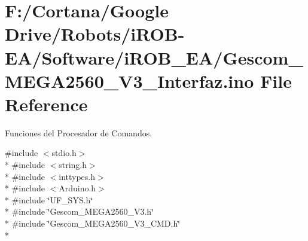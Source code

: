 \hypertarget{_gescom___m_e_g_a2560___v3___interfaz_8ino}{}\section{F\+:/\+Cortana/\+Google Drive/\+Robots/i\+R\+O\+B-\/\+E\+A/\+Software/i\+R\+O\+B\+\_\+\+E\+A/\+Gescom\+\_\+\+M\+E\+G\+A2560\+\_\+\+V3\+\_\+\+Interfaz.ino File Reference}
\label{_gescom___m_e_g_a2560___v3___interfaz_8ino}


Funciones del Procesador de Comandos.  


{\ttfamily \#include $<$stdio.\+h$>$}\\*
{\ttfamily \#include $<$string.\+h$>$}\\*
{\ttfamily \#include $<$inttypes.\+h$>$}\\*
{\ttfamily \#include $<$Arduino.\+h$>$}\\*
{\ttfamily \#include \char`\"{}U\+F\+\_\+\+S\+Y\+S.\+h\char`\"{}}\\*
{\ttfamily \#include \char`\"{}Gescom\+\_\+\+M\+E\+G\+A2560\+\_\+\+V3.\+h\char`\"{}}\\*
{\ttfamily \#include \char`\"{}Gescom\+\_\+\+M\+E\+G\+A2560\+\_\+\+V3\+\_\+\+C\+M\+D.\+h\char`\"{}}\\*
